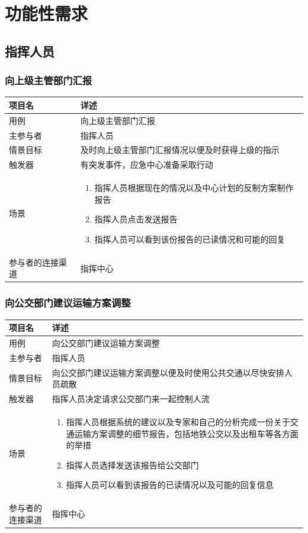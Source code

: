 \documentclass{ctexrep}
\begin{document}
\section{功能性需求}
\subsection{指挥人员}
\subsubsection{向上级主管部门汇报}
\begin{longtable}{p{2cm} | p{10cm}}
\hline
项目名 & 详述 \\
\hline
\hline
用例 & 向上级主管部门汇报\\
\hline
主参与者 & 指挥人员 \\
\hline
情景目标 &  及时向上级主管部门汇报情况以便及时获得上级的指示\\
\hline
触发器 & 有突发事件，应急中心准备采取行动\\
\hline
场景 & \begin{enumerate}
	\item 指挥人员根据现在的情况以及中心计划的反制方案制作报告
	\item 指挥人员点击发送报告
	\item 指挥人员可以看到该份报告的已读情况和可能的回复
\end{enumerate} \\
\hline
参与者的连接渠道 & 指挥中心 \\
\hline
\end{longtable}

\subsubsection{向公交部门建议运输方案调整}
\begin{longtable}{p{2cm} | p{10cm}}
\hline
项目名 & 详述 \\
\hline
\hline
用例 & 向公交部门建议运输方案调整\\
\hline
主参与者 & 指挥人员 \\
\hline
情景目标 & 向公交部门建议运输方案调整以便及时使用公共交通以尽快安排人员疏散 \\
\hline
触发器 & 指挥人员决定请求公交部门来一起控制人流 \\
\hline
场景 & \begin{enumerate}
	\item 指挥人员根据系统的建议以及专家和自己的分析完成一份关于交通运输方案调整的细节报告，包括地铁公交以及出租车等各方面的举措
	\item 指挥人员选择发送该报告给公交部门
	\item 指挥人员可以看到该报告的已读情况以及可能的回复信息
\end{enumerate} \\
\hline
参与者的连接渠道 & 指挥中心\\
\hline
\end{longtable}
\end{document}
